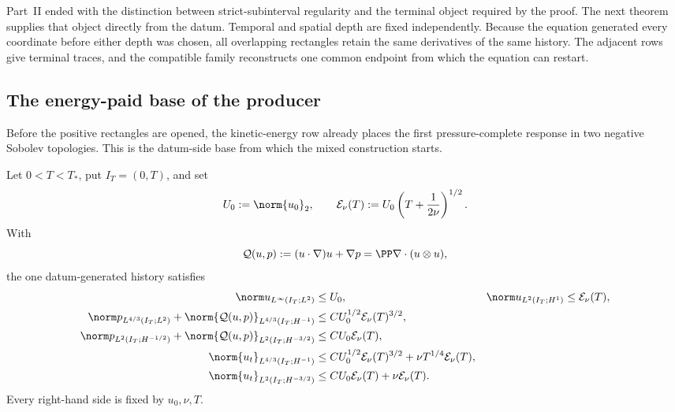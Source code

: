 \label{sec:whole-terminal-control}

Part~II ended with the distinction between strict-subinterval regularity and
the terminal object required by the proof.  The next theorem supplies that
object directly from the datum.  Temporal and spatial depth are fixed
independently.  Because the equation generated every coordinate before either
depth was chosen, all overlapping
rectangles retain the same derivatives of the same history.  The adjacent
rows give terminal traces, and the compatible family reconstructs one common
endpoint from which the equation can restart.

\subsection{The energy-paid base of the producer}

Before the positive rectangles are opened, the kinetic-energy row already
places the first pressure-complete response in two negative Sobolev
topologies.  This is the datum-side base from which the mixed construction
starts.

\begin{proposition}
\label{prop:energy-paid-response-faces}
Let \(0<T<T_*\), put \(I_T=(0,T)\), and set
\begin{equation}
 U_0:=\norm{u_0}_2,
 \qquad
 \mathcal E_\nu(T):=
 U_0\left(T+\frac1{2\nu}\right)^{1/2}.
 \label{eq:energy-paid-size}
\end{equation}
With
\[
 \mathcal Q(u,p):=(u\cdot\nabla)u+\nabla p
 =\PP\nabla\cdot(u\otimes u),
\]
the one datum-generated history satisfies
\begin{align}
 \norm u_{L^\infty(I_T;L^2)}
 &\le U_0,
 &
 \norm u_{L^2(I_T;H^1)}
 &\le\mathcal E_\nu(T),
 \label{eq:energy-paid-velocity}\\
 \norm p_{L^{4/3}(I_T;L^2)}
 +\norm{\mathcal Q(u,p)}_{L^{4/3}(I_T;H^{-1})}
 &\le C U_0^{1/2}\mathcal E_\nu(T)^{3/2},
 \label{eq:energy-paid-four-thirds}\\
 \norm p_{L^2(I_T;H^{-1/2})}
 +\norm{\mathcal Q(u,p)}_{L^2(I_T;H^{-3/2})}
 &\le C U_0\mathcal E_\nu(T),
 \label{eq:energy-paid-square}\\
 \norm{u_t}_{L^{4/3}(I_T;H^{-1})}
 &\le
 C U_0^{1/2}\mathcal E_\nu(T)^{3/2}
 {}+\nu T^{1/4}\mathcal E_\nu(T),
 \label{eq:energy-paid-time-four-thirds}\\
 \norm{u_t}_{L^2(I_T;H^{-3/2})}
 &\le
 C U_0\mathcal E_\nu(T)
 {}+\nu\mathcal E_\nu(T).
 \label{eq:energy-paid-time-square}
\end{align}
Every right-hand side is fixed by \(u_0,\nu,T\).
\end{proposition}


